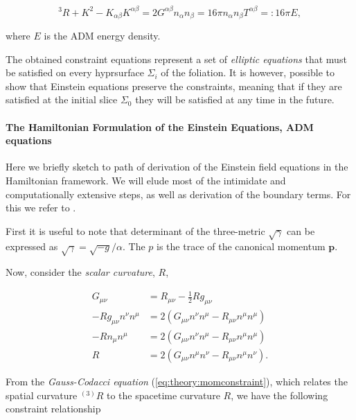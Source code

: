 {    \begin{equation}
    ^3 R+ K^2 - K_{\alpha\beta}K^{\alpha\beta} = 2G^{\alpha\beta}n_{\alpha}n_{\beta} = 16\pi n_{\alpha}n_{\beta} T^{\alpha\beta} =: 16\pi E,
    \label{eq:theory:hamilconstraint}
    \end{equation}
    
    where $E$ is the ADM energy density.
    
    The obtained constraint equations represent a set of \textit{elliptic equations} that must be satisfied on every hyprsurface $\Sigma_i$ of the foliation. 
    It is however, possible to show that Einstein equations preserve the constraints, meaning that if they are satisfied at the initial slice $\Sigma_0$ they will be satisfied at any time in the future.
    
    
    \paragraph{The Hamiltonian Formulation of the Einstein Equations, ADM equations}
    
    
    
    
    Here we briefly sketch to path of derivation of the Einstein field equations in the Hamiltonian framework. We will elude most of the intimidate and computationally extensive steps, as well as derivation of the boundary terms. For this we refer to \cite{Poisson:2004}.
    
    First it is useful to note that determinant of the three-metric $\sqrt{\gamma}$ can be expressed as $\sqrt{\gamma}=\sqrt{-g}/\alpha$. 
    The $p$ is the trace of the canonical momentum $\boldsymbol{p}$.
    
    Now, consider the \textit{scalar curvature}, $R$,
    
    \begin{align}
    G_{\mu\nu} &= R_{\mu\nu} - \frac{1}{2}Rg_{\mu\nu} \\
    -Rg_{\mu\nu}n^{\nu}n^{\mu} &= 2(G_{\mu\nu} n^{\nu}n^{\mu}-R_{\mu\nu}n^{\mu}n^{\mu})\\
    -Rn_{\mu}n^{\mu}& = 2(G_{\mu\nu}n^{\nu}n^{\mu} - R_{\mu\nu}n^{\mu}n^{\mu}) \\
    R &= 2(G_{\mu\nu}n^{\mu}n^{\nu} - R_{\mu\nu}n^{\mu}n^{\nu}).
    \end{align}
    
    From the \textit{Gauss-Codacci equation} (\ref{eq:theory:momconstraint}), which relates the spatial curvature $^{(3)}R$ to the spacetime curvature $R$, we have the following constraint relationship
    
}
